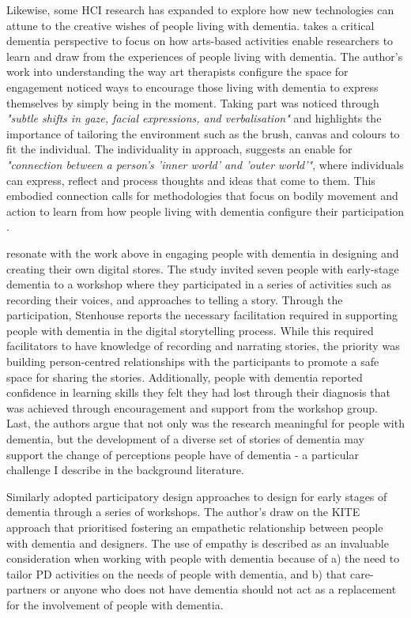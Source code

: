 Likewise, some HCI research has expanded to explore how new technologies can attune to the creative wishes of people living with dementia. \cite{lazar_critical_2017} takes a critical dementia perspective to focus on how arts-based activities enable researchers to learn and draw from the experiences of people living with dementia. The author's work into understanding the way art therapists configure the space for engagement noticed ways to encourage those living with dementia to express themselves by simply being in the moment. Taking part was noticed through \textit{"subtle shifts in gaze, facial expressions, and verbalisation"} and highlights the importance of tailoring the environment such as the brush, canvas and colours to fit the individual. The individuality in approach, suggests an enable for \textit{"connection between a person's 'inner world' and 'outer world'"}, where individuals can express, reflect and process thoughts and ideas that come to them. This embodied connection calls for methodologies that focus on bodily movement and action to learn from how people living with dementia configure their participation \citep{morrissey_creative_2015}.

\cite{stenhouse2013dangling} resonate with the work above in engaging people with dementia in designing and creating their own digital stores. The study invited seven people with early-stage dementia to a workshop where they participated in a series of activities such as recording their voices, and approaches to telling a story. Through the participation, Stenhouse reports the necessary facilitation required in supporting people with dementia in the digital storytelling process. While this required facilitators to have knowledge of recording and narrating stories, the priority was building person-centred relationships with the participants to promote a safe space for sharing the stories. Additionally, people with dementia reported confidence in learning skills they felt they had lost through their diagnosis that was achieved through encouragement and support from the workshop group. Last, the authors argue that not only was the research meaningful for people with dementia, but the development of a diverse set of stories of dementia may support the change of perceptions people have of dementia - a particular challenge I describe in the background literature. 

Similarly \cite{lindsay_empathy_2012} adopted participatory design approaches to design for early stages of dementia through a series of workshops. The author's draw on the KITE approach that prioritised fostering an empathetic relationship between people with dementia and designers. The use of empathy is described as an invaluable consideration when working with people with dementia because of a) the need to tailor PD activities on the needs of people with dementia, and b) that care-partners or anyone who does not have dementia should not act as a replacement for the involvement of people with dementia. 

